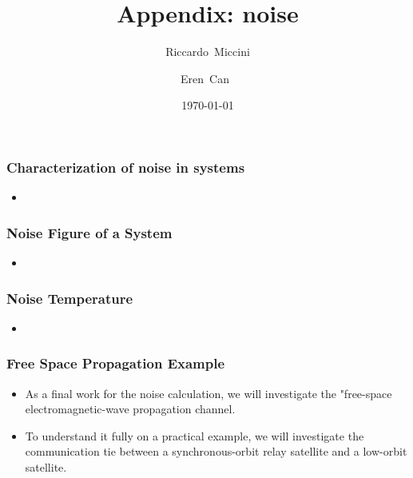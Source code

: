 \documentclass{beamer}
\title{Appendix: noise}
\subtitle{}
\author[Riccardo \and Eren]{Riccardo~Miccini\inst{1} \and Eren~Can~\inst{1}}
\institute[DTU]
{
	\inst{1}
	Technical University of Denmark\\
	Digital Communication
}
\date{\today}
\begin{document}
\frame{\titlepage}

\begin{frame}
	\frametitle{Characterization of noise in systems}
	\begin{itemize}
		\item
	\end{itemize}
\end{frame}


\begin{frame}
	\frametitle{Noise Figure of a System}
	\begin{itemize}
		\item 
	\end{itemize}
\end{frame}


\begin{frame}
	\frametitle{Noise Temperature}
	\begin{itemize}
		\item
	\end{itemize}
\end{frame}


\begin{frame}
	\frametitle{Free Space Propagation Example}
	\begin{itemize}
		\item As a final work for the noise calculation, we will investigate the "free-space electromagnetic-wave propagation channel.
		\item To understand it fully on a practical example, we will investigate the communication tie between a synchronous-orbit relay satellite and a low-orbit satellite.
		\end{itemize}
\end{frame}
\end{document}
